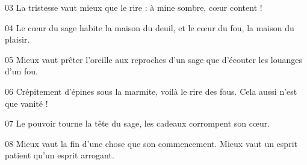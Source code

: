 03 La tristesse vaut mieux que le rire : à mine sombre, cœur content !

04 Le cœur du sage habite la maison du deuil, et le cœur du fou, la maison du plaisir.

05 Mieux vaut prêter l’oreille aux reproches d’un sage que d’écouter les louanges d’un fou.

06 Crépitement d’épines sous la marmite, voilà le rire des fous. Cela aussi n’est que vanité !

07 Le pouvoir tourne la tête du sage, les cadeaux corrompent son cœur.

08 Mieux vaut la fin d’une chose que son commencement. Mieux vaut un esprit patient qu’un esprit arrogant.